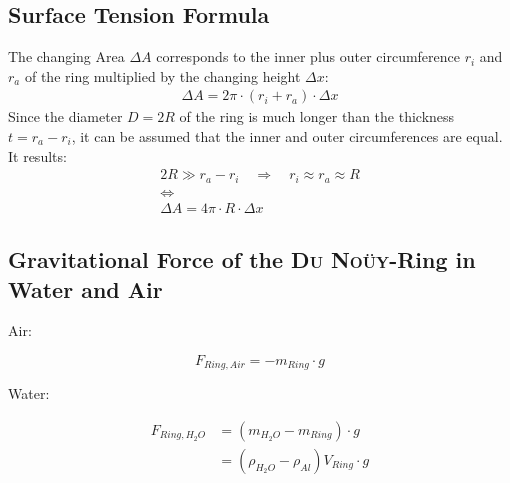         \subsection*{Surface Tension Formula}\label{sec:A2 derive eq.4}%
            The changing Area $ \Delta A $ corresponds to the inner plus outer circumference $ r_i $ and $ r_a $ of
            the ring multiplied by the changing height $ \Delta x $:
            \begin{align}
                \Delta A = 2\pi \cdot (r_i + r_a) \cdot \Delta x
            \end{align}
            Since the diameter $ D = 2R $ of the ring is much longer than the thickness $ t = r_a - r_i $, it can be assumed
            that the inner and outer circumferences are equal. It results:
            \begin{equation}
                \begin{gathered}
                    2R \gg r_a-r_i \quad \Rightarrow \quad r_i \approx r_a \approx R \\
                    \Leftrightarrow \\
                    \Delta A = 4\pi \cdot R \cdot \Delta x
                \end{gathered}
            \end{equation}
        \subsection{Gravitational Force of the \textsc{Du Noüy}-Ring in Water and Air}\label{sec:A3 gravi force of du noüy ring}%
            Air:

            \begin{equation}
                F_{Ring,Air} = -m_{Ring} \cdot g
            \end{equation}

            Water:

            \begin{align}
                F_{Ring,H_2O}  &= \left( m_{H_2O} - m_{Ring}\right) \cdot g \nonumber \\
                                &= \left(\rho_{H_2O} - \rho_{Al}\right)V_{Ring} \cdot g
            \end{align}
